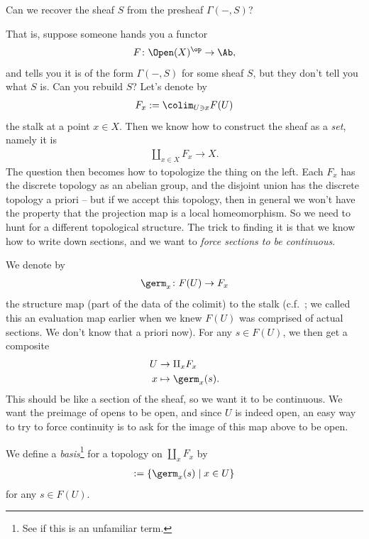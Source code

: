\documentclass[11pt]{amsart}
\begin{document}
\begin{question}\label{ques:recover-sheaf-from-presheaf} 
Can we recover the sheaf $S$ from the presheaf $\Gamma(-,S)$?
\end{question}

That is, suppose someone hands you a functor
\begin{align*}
    F \colon \Open(X)^\op \to \Ab,
\end{align*}
and tells you it is of the form $\Gamma(-,S)$ for some sheaf $S$, but they don't tell you what $S$ is. Can you rebuild $S$? Let's denote by
\begin{align*}
    F_x := \colim_{U\ni x} F(U)
\end{align*}
the stalk at a point $x\in X$. Then we know how to construct the sheaf as a \emph{set}, namely it is
\begin{align*}
    \amalg_{x\in X} F_x \to X.
\end{align*}
The question then becomes how to topologize the thing on the left. Each $F_x$ has the discrete topology as an abelian group, and the disjoint union has the discrete topology a priori -- but if we accept this topology, then in general we won't have the property that the projection map is a local homeomorphism. So we need to hunt for a different topological structure. The trick to finding it is that we know how to write down sections, and we want to \emph{force sections to be continuous}.

We denote by
\begin{align*}
    \germ_x \colon F(U) \to F_x
\end{align*}
the structure map (part of the data of the colimit) to the stalk (c.f.~; we called this an evaluation map earlier when we knew $F(U)$ was comprised of actual sections. We don't know that a priori now). For any $s\in F(U)$, we then get a composite
\begin{align*}
    U &\to \amalg_x F_x \\
    x &\mapsto \germ_x(s).
\end{align*}
This should be like a section of the sheaf, so we want it to be continuous. We want the preimage of opens to be open, and since $U$ is indeed open, an easy way to try to force continuity is to ask for the image of this map above to be open.

\begin{definition}\label{def:basis-for-topology-on-espace-etale} 
We define a \emph{basis}\footnote{See \cite[II\S13]{Munkres} if this is an unfamiliar term.} for a topology on $\amalg_x F_x$ by
\begin{align*}
    [(s,U)] := \left\{ \germ_x(s) \mid x\in U \right\}
\end{align*}
for any $s\in F(U)$.
\end{definition}
\end{document}
